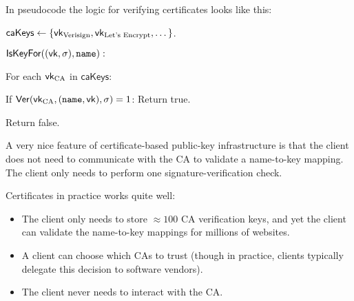 In pseudocode the logic for verifying certificates looks like this:
\begin{framed}
\noindent
$\mathsf{caKeys} \gets \{\mathsf{vk}_\text{Verisign}, \mathsf{vk}_\text{Let's Encrypt}, \dots \}$.

\medskip
\noindent
$\mathsf{IsKeyFor}((\mathsf{vk}, \sigma), \texttt{name}):$ 
\begin{compactitem}
\item For each $\mathsf{vk}_\text{CA}$ in $\mathsf{caKeys}$:
      \begin{compactitem}
      \item If $\mathsf{Ver}(\mathsf{vk}_\text{CA}, (\texttt{name}, \mathsf{vk}), \sigma) = 1$: Return true.
      \end{compactitem}
\item Return false.
\end{compactitem}
\end{framed}

A very nice feature of certificate-based public-key infrastructure is that
the client does not need to communicate with the CA to validate a 
name-to-key mapping. The client only needs to perform one signature-verification
check.

Certificates in practice works quite well:
\begin{itemize}[noitemsep]
	\item The client only needs to store $\approx 100$ CA verification keys,
        and yet the client can validate the name-to-key mappings for millions of websites.
	\item A client can choose which CAs to trust 
        (though in practice, clients typically delegate this decision to software vendors).
	\item The client never needs to interact with the CA.
\end{itemize}

